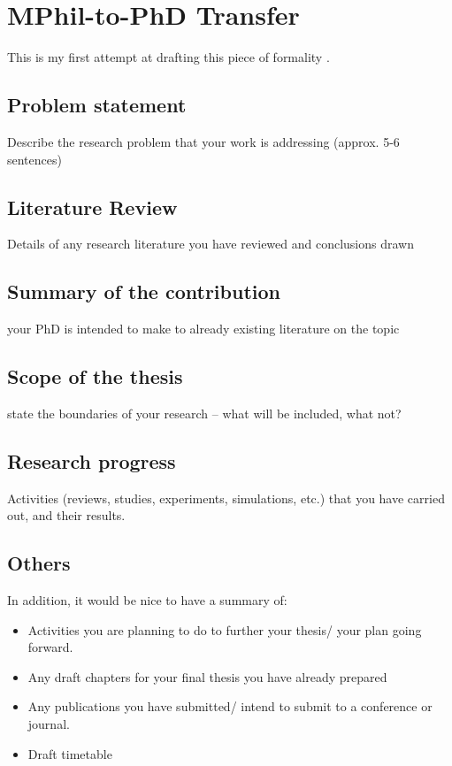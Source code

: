 \chapter{MPhil-to-PhD Transfer}
\label{chapterlabel1}

This is my first attempt at drafting this piece of formality \cite{example-citation}. 
\section{Problem statement}
Describe the research problem that your work is addressing (approx. 5-6 sentences)

\section{Literature Review} 
Details of any research literature you have reviewed and conclusions drawn

\section{Summary of the contribution} 
your PhD is intended to make to already existing literature on the topic

\section{Scope of the thesis}
state the boundaries of your research – what will be included, what not?

\section{Research progress}
Activities (reviews, studies, experiments, simulations, etc.) that you have carried out, and their results. 

\section{Others}
In addition, it would be nice to have a summary of:
\begin{itemize}
	\item Activities you are planning to do to further your thesis/ your plan going forward.
	\item Any draft chapters for your final thesis you have already prepared
	\item Any publications you have submitted/ intend to submit to a conference or journal.
	\item Draft timetable 
\end{itemize}
